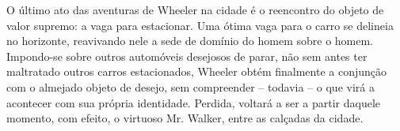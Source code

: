 \begin{multicols}{2}
\par
{
}
\par
\par{}O último ato das aventuras de Wheeler na cidade é o reencontro do objeto de valor supremo:\allowbreak{} a vaga para estacionar.\allowbreak{} Uma ótima vaga para o carro se delineia no horizonte,\allowbreak{} reavivando nele a sede de domínio do homem sobre o homem.\allowbreak{} Impondo-\allowbreak{}se sobre outros automóveis desejosos de parar,\allowbreak{} não sem antes ter maltratado outros carros estacionados,\allowbreak{} Wheeler obtém finalmente a conjunção com o almejado objeto de desejo,\allowbreak{} sem compreender – todavia – o que virá a acontecer com sua própria identidade.\allowbreak{} Perdida,\allowbreak{} voltará a ser a partir daquele momento,\allowbreak{} com efeito,\allowbreak{} o virtuoso Mr.\allowbreak{} Walker,\allowbreak{} entre as calçadas da cidade.\allowbreak{} 

\end{multicols}
